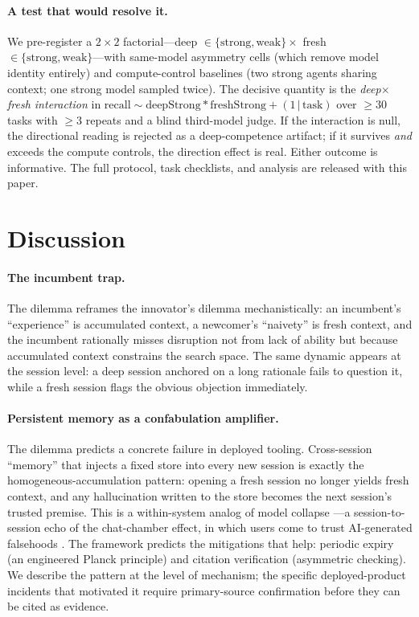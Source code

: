 \documentclass[12pt]{article}
\begin{document}
\paragraph{A test that would resolve it.} We pre-register a
$2\times2$ factorial---deep $\in\{\text{strong},\text{weak}\}\times$ fresh
$\in\{\text{strong},\text{weak}\}$---with same-model asymmetry cells (which
remove model identity entirely) and compute-control baselines (two strong agents
sharing context; one strong model sampled twice). The decisive quantity is the
\emph{deep$\times$fresh interaction} in
$\text{recall}\sim\text{deepStrong}*\text{freshStrong}+(1\,|\,\text{task})$ over
$\geq 30$ tasks with $\geq 3$ repeats and a blind third-model judge. If the
interaction is null, the directional reading is rejected as a deep-competence
artifact; if it survives \emph{and} exceeds the compute controls, the direction
effect is real. Either outcome is informative. The full protocol, task
checklists, and analysis are released with this paper.

\section{Discussion}

\paragraph{The incumbent trap.} The dilemma reframes the innovator's dilemma
\citep{christensen1997innovator} mechanistically: an incumbent's ``experience''
is accumulated context, a newcomer's ``naivety'' is fresh context, and the
incumbent rationally misses disruption not from lack of ability but because
accumulated context constrains the search space. The same dynamic appears at the
session level: a deep session anchored on a long rationale fails to question it,
while a fresh session flags the obvious objection immediately.

\paragraph{Persistent memory as a confabulation amplifier.} The dilemma predicts
a concrete failure in deployed tooling. Cross-session ``memory'' that injects a
fixed store into every new session is exactly the homogeneous-accumulation
pattern: opening a fresh session no longer yields fresh context, and any
hallucination written to the store becomes the next session's trusted premise.
This is a within-system analog of model collapse
\citep{shumailov2024collapse}---a session-to-session echo of the chat-chamber
effect, in which users come to trust AI-generated falsehoods
\citep{jacob2025chatchamber}. The framework predicts the mitigations that help:
periodic expiry (an engineered Planck principle) and citation verification
(asymmetric checking). We describe the pattern at the level of mechanism; the
specific deployed-product incidents that motivated it require primary-source
confirmation before they can be cited as evidence.
\end{document}

